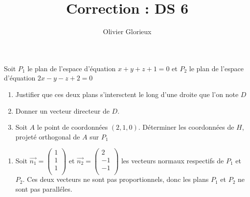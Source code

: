 \documentclass[a4paper, 11pt,reqno]{article}
\author{Olivier Glorieux}
\newcommand\vv[1]{\overrightarrow{#1}}
\begin{document}
\title{Correction : DS 6
}


\begin{exercice}
Soit $P_1$ le plan de l'espace d'équation $x+y+z+1=0$ et $P_2$ le plan de l'espace  d'équation $2x-y-z+2=0$
\begin{enumerate}
\item Justifier que ces deux plans s'intersctent le long d'une droite que l'on note $D$
\item Donner un vecteur directeur de $D$. 
\item Soit $A$ le point de coordonnées $(2,1,0)$. Déterminer les coordonnées de $H$,  projeté orthogonal de $A$ sur $P_1$
\end{enumerate}
\end{exercice}

\begin{correction}
\begin{enumerate}
\item Soit $\vv{n_1} = \begin{pmatrix}
1\\
1\\
1\\
\end{pmatrix} $ et $\vv{n_2} = \begin{pmatrix}
2\\
-1\\
-1\\
\end{pmatrix} $ les vecteurs normaux respectifs de $P_1$ et $P_2$. Ces deux vecteurs ne sont pas proportionnels, donc les plans $P_1$ et $P_2$ ne sont pas paralléles. 


\end{enumerate}
\end{correction}
\end{document}
